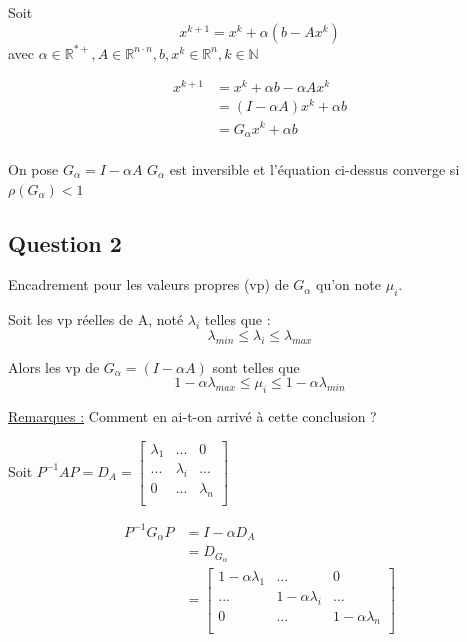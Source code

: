 \documentclass[11pt]{article}
\begin{document}
Soit $$x^{k + 1} = x^k + \alpha (b - Ax^k)$$
avec $\alpha \in \mathbb{R}^{*+}, A \in \mathbb{R}^{n \cdot n}, b, x^k
\in \mathbb{R}^n, k \in \mathbb{N}$\newline

\begin{equation*}
  \begin{split}
    x^{k+1} & = x^k + \alpha b - \alpha A x^k \\
    & = (I - \alpha A) x^k + \alpha b \\
    & = G_{\alpha} x^k + \alpha b \\
  \end{split}
\end{equation*}

On pose $G_{\alpha} = I - \alpha A$\newline
\vspace{5mm}
$G_{\alpha}$ est inversible et l'équation ci-dessus converge si
$\rho(G_{\alpha}) < 1$

\subsection{Question 2}

Encadrement pour les valeurs propres (vp) de $G_{\alpha}$ qu'on note
$\mu_i$.\newline

\vspace{5mm}

Soit les vp réelles de A, noté $\lambda_i$ telles que :
$$ \lambda_{min} \le \lambda_i \le \lambda_{max} $$

Alors les vp de $G_{\alpha} = (I - \alpha A)$ sont telles  que
$$ 1 - \alpha \lambda_{max} \le \mu_i \le 1 - \alpha \lambda_{min}$$

\underline{Remarques :} Comment en ai-t-on arrivé à cette conclusion ?\newline

\vspace{5mm}

Soit $P^{-1}AP = D_A = \left[
  \begin{array}{ccc}
    \lambda_1 & ... & 0 \\
    ... & \lambda_i & ... \\
    0 & ... & \lambda_n \\
  \end{array}
  \right]$

\begin{equation*}
  \begin{split}
    P^{-1}G_{\alpha}P & = I - \alpha D_A \\
    & = D_{G_{\alpha}} \\
    & = \left[
      \begin{array}{ccc}
        1 - \alpha \lambda_1 & ... & 0 \\
        ... & 1 - \alpha \lambda_i & ... \\
        0 & ... & 1 - \alpha \lambda_n \\
      \end{array}
      \right]
  \end{split}
\end{equation*}
\end{document}
